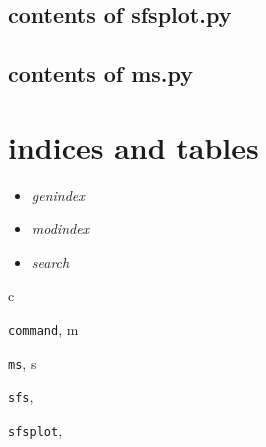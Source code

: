 \documentclass[letterpaper,10pt,english]{sphinxmanual}
\begin{document}
\section{contents of sfsplot.py}
\label{index:contents-of-sfsplot-py}\label{index:module-sfsplot}

\section{contents of ms.py}
\label{index:contents-of-ms-py}\label{index:module-ms}

\chapter{indices and tables}
\label{index:indices-and-tables}\begin{itemize}
\item {} 
\emph{genindex}

\item {} 
\emph{modindex}

\item {} 
\emph{search}

\end{itemize}


\renewcommand{\indexname}{Python Module Index}
\begin{theindex}
\def\bigletter#1{{\Large\sffamily#1}\nopagebreak\vspace{1mm}}
\bigletter{c}
\item {\texttt{command}}, \pageref{index:module-command}
\indexspace
\bigletter{m}
\item {\texttt{ms}}, \pageref{index:module-ms}
\indexspace
\bigletter{s}
\item {\texttt{sfs}}, \pageref{index:module-sfs}
\item {\texttt{sfsplot}}, \pageref{index:module-sfsplot}
\end{theindex}

\renewcommand{\indexname}{Index}
\printindex
\end{document}
